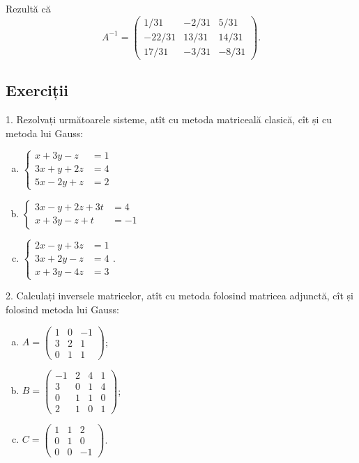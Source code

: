 Rezultă că 
\[
  A^{-1} = %
  \begin{pmatrix} 
    1/31 & -2/31 & 5/31 \\
    -22/31 & 13/31 & 14/31 \\
    17/31 & -3/31 & -8/31
  \end{pmatrix}.
\]


\subsection{Exerciții}

1. Rezolvați următoarele sisteme, atît cu metoda matriceală clasică, cît și cu
metoda lui Gauss:
\begin{enumerate}[(a)]
\item $ \begin{cases}
    x + 3y - z &= 1 \\
    3x + y + 2z &= 4 \\
    5x - 2y + z &= 2
  \end{cases} $
\item $ \begin{cases}
    3x - y + 2z + 3t &= 4 \\
    x + 3y - z + t &= -1
  \end{cases} $
\item $ \begin{cases}
    2x - y + 3z &= 1 \\
    3x + 2y - z &= 4 \\
    x + 3y - 4z &= 3
  \end{cases} $.
\end{enumerate}

\vspace{1cm}

2. Calculați inversele matricelor, atît cu metoda folosind matricea adjunctă,
cît și folosind metoda lui Gauss:
\begin{enumerate}[(a)]
\item $ A =
  \begin{pmatrix}
    1 & 0 & -1 \\
    3 & 2 & 1 \\
    0 & 1 & 1
  \end{pmatrix} $;
\item $ B =
  \begin{pmatrix}
    -1 & 2 & 4 & 1 \\
    3 & 0 & 1 & 4 \\
    0 & 1 & 1 & 0 \\
    2 & 1 & 0 & 1
  \end{pmatrix} $;
\item $ C =
  \begin{pmatrix}
    1 & 1 & 2 \\
    0 & 1 & 0 \\
    0 & 0 & -1
  \end{pmatrix} $.
\end{enumerate}


